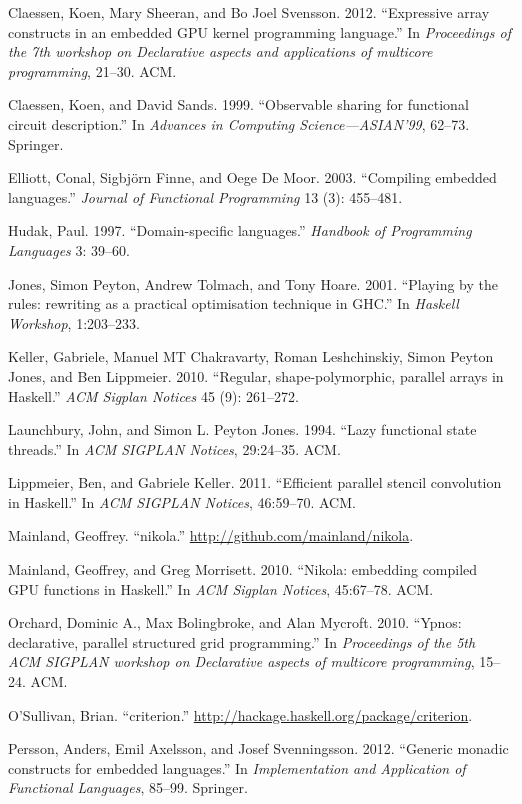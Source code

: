 \documentclass[preprint]{sigplanconf}
\begin{document}
Claessen, Koen, Mary Sheeran, and Bo Joel Svensson. 2012. ``Expressive
array constructs in an embedded GPU kernel programming language.'' In
\emph{Proceedings of the 7th workshop on Declarative aspects and
applications of multicore programming}, 21--30. ACM.

Claessen, Koen, and David Sands. 1999. ``Observable sharing for
functional circuit description.'' In \emph{Advances in Computing
Science---ASIAN'99}, 62--73. Springer.

Elliott, Conal, Sigbjörn Finne, and Oege De Moor. 2003. ``Compiling
embedded languages.'' \emph{Journal of Functional Programming} 13 (3):
455--481.

Hudak, Paul. 1997. ``Domain-specific languages.'' \emph{Handbook of
Programming Languages} 3: 39--60.

Jones, Simon Peyton, Andrew Tolmach, and Tony Hoare. 2001. ``Playing by
the rules: rewriting as a practical optimisation technique in GHC.'' In
\emph{Haskell Workshop}, 1:203--233.

Keller, Gabriele, Manuel MT Chakravarty, Roman Leshchinskiy, Simon
Peyton Jones, and Ben Lippmeier. 2010. ``Regular, shape-polymorphic,
parallel arrays in Haskell.'' \emph{ACM Sigplan Notices} 45 (9):
261--272.

Launchbury, John, and Simon L. Peyton Jones. 1994. ``Lazy functional
state threads.'' In \emph{ACM SIGPLAN Notices}, 29:24--35. ACM.

Lippmeier, Ben, and Gabriele Keller. 2011. ``Efficient parallel stencil
convolution in Haskell.'' In \emph{ACM SIGPLAN Notices}, 46:59--70. ACM.

Mainland, Geoffrey. ``nikola.'' \url{http://github.com/mainland/nikola}.

Mainland, Geoffrey, and Greg Morrisett. 2010. ``Nikola: embedding
compiled GPU functions in Haskell.'' In \emph{ACM Sigplan Notices},
45:67--78. ACM.

Orchard, Dominic A., Max Bolingbroke, and Alan Mycroft. 2010. ``Ypnos:
declarative, parallel structured grid programming.'' In
\emph{Proceedings of the 5th ACM SIGPLAN workshop on Declarative aspects
of multicore programming}, 15--24. ACM.

O'Sullivan, Brian. ``criterion.''
\url{http://hackage.haskell.org/package/criterion}.

Persson, Anders, Emil Axelsson, and Josef Svenningsson. 2012. ``Generic
monadic constructs for embedded languages.'' In \emph{Implementation and
Application of Functional Languages}, 85--99. Springer.
\end{document}

